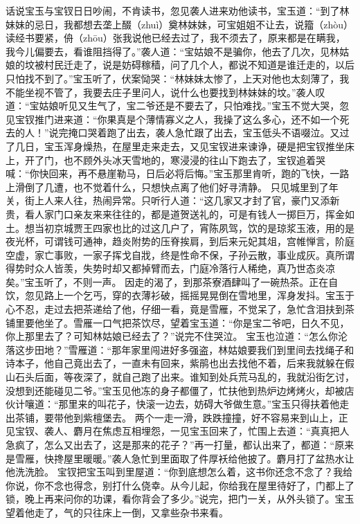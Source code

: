 \documentclass[12pt,oneside]{book}
\begin{document}
话说宝玉与宝钗日日吵闹，不肯读书，忽见袭人进来劝他读书，宝玉道：“到了林妹妹的忌日，我都想去垄上醊（zhuì）奠林妹妹，可宝姐姐不让去，说籀（zhòu）读经书要紧，侜（zhōu）张我说他已经去过了，我不须去了，原来都是在瞒我，我今儿偏要去，看谁阻挡得了。”袭人道：“宝姑娘不是骗你，他去了几次，见林姑娘的坟被村民迁走了，说是妨碍稼穑，问了几个人，都说不知道是谁迁走的，以后只怕找不到了。”宝玉听了，伏案恸哭：“林妹妹太惨了，上天对他也太刻薄了，我不能坐视不管了，我要去庄子里问人，说什么也要找到林妹妹的坟。”袭人叹道：“宝姑娘听见又生气了，宝二爷还是不要去了，只怕难找。”宝玉不觉大哭，忽见宝钗推门进来道：“你果真是个薄情寡义之人，我操了这么多心，还不如一个死去的人！”说完掩口哭着跑了出去，袭人急忙跟了出去，宝玉低头不语啜泣。又过了几日，宝玉浑身燥热，在屋里走来走去，又见宝钗进来谏诤，硬是把宝钗推坐床上，开了门，也不顾外头冰天雪地的，寒浸浸的往山下跑去了，宝钗追着哭喊：“你快回来，再不悬崖勒马，日后必将后悔。”宝玉那里肯听，跑的飞快，一路上滑倒了几遭，也不觉着什么，只想快点离了他们好寻清静。
只见城里到了年关，街上人来人往，热闹异常。只听行人道：“这几家又才封了官，豪门又添新贵，看人家门口亲友来来往往的，都是道贺送礼的，可是有钱人一掷巨万，挥金如土。想当初京城贾王四家也比的过这几户了，宵陈夙驾，饮的是琼浆玉液，用的是夜光杯，可谓钱可通神，趋炎附势的压脊挨肩，到后来元妃其俎，宫帷惮言，阶庭空虚，家亡事败，一家子挥戈自戕，终是性命不保，子孙云散，事业成灰。真所谓得势时众人皆羡，失势时却又都掉臂而去，门庭冷落行人稀绝，真乃世态炎凉矣。”宝玉听了，不则一声。
因走的渴了，到那茶寮酒肆叫了一碗热茶。正在自饮，忽见路上一个乞丐，穿的衣薄衫破，摇摇晃晃倒在雪地里，浑身发抖。宝玉于心不忍，走过去把茶递给了他，仔细一看，竟是雪雁，不觉呆了，急忙含泪扶到茶铺里要他坐了。雪雁一口气把茶饮尽，望着宝玉道：“你是宝二爷吧，日久不见，你上那里去了？可知林姑娘已经去了？”说完不住哭泣。
宝玉也泣道：“怎么你沦落这步田地？”雪雁道：“那年家里闯进好多强盗，林姑娘要我们到里间去找绳子和诗本子，他自己竟出去了，一直未有回来，紫鹃也出去找他不着，后来我就躲在假山石头后面，等夜深了，就自己跑了出来。谁知到处兵荒马乱的，我就沿街乞讨，没想到还能碰见二爷。”宝玉见他冻的身子都僵了，忙扶他到热炉边烤烤火，却被店伙计嚷道：“那里来的叫花子，快滚一边去，妨碍大爷做生意。”宝玉只得扶着他走出茶铺，要带他到紫檀堡去。
两个一走一滑，跌跌撞撞，好不容易来到山上，正见宝钗、袭人、麝月在焦虑互相埋怨，一见宝玉回来了，忙围上去道：“真真把人急疯了，怎么又出去了，这是那来的花子？”再一打量，都认出来了，都道：“原来是雪雁，快搀屋里暖暖。”袭人急忙到里面取了件厚袄给他披了。麝月打了盆热水让他洗洗脸。
宝钗把宝玉叫到里屋道：“你到底想怎么着，这书你还念不念了？我给你说，你不念也得念，别打什么侥幸。从今儿起，你给我在屋里待好了，门都上了锁，晚上再来问你的功课，看你背会了多少。”说完，把门一关，从外头锁了。宝玉望着他走了，气的只往床上一倒，又拿些杂书来看。
\end{document}
